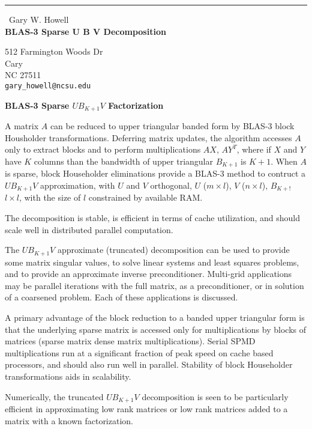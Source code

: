 \documentclass{report}
\begin{document}
\begin{center}
\rule{6in}{1pt} \
{\large Gary W. Howell \\
{\bf BLAS-3 Sparse U B V Decomposition }}

512 Farmington Woods Dr \\ Cary \\ NC 27511
\\
{\tt gary_howell@ncsu.edu}\end{center}

\begin{center}
{\large\bf
BLAS-3 Sparse $U B_{K+1}V$ Factorization} \\[4mm]
\end{center}

\par\vspace*{-1.0mm}\noindent
A matrix $A$ can be reduced to upper triangular banded form
by BLAS-3 block Housholder transformations. Deferring matrix updates, the
algorithm accesses $A$ only to extract blocks and to perform
multiplications $AX$, $AY^T$, where if $X$ and $Y$ have $K$ columns than
the bandwidth of upper triangular $B_{K+1}$ is $K+1$. When $A$ is sparse,
block Householder eliminations provide a BLAS-3 method to contruct a $U
B_{K+1}V$ approximation, with $U$ and $V$ orthogonal, $U$ ($m \times l$),
$V$ ($n \times l$), $B_{K+!}$ $l \times l$, with the size of $l$
constrained by available RAM.

The decomposition is stable, is efficient in terms
of cache utilization, and should scale well in distributed parallel computation.

The $U B_{K+1} V$ approximate (truncated) decomposition can be used to
provide some matrix singular values, to solve linear systems and least
squares problems, and to provide an approximate inverse preconditioner.
Multi-grid applications may be parallel iterations with the full matrix,
as a preconditioner, or in solution of a coarsened problem. Each of these
applications is discussed.

A primary advantage of the block reduction to a banded upper triangular
form is that the underlying sparse matrix is accessed only for
multiplications by blocks of matrices (sparse matrix dense matrix
multiplications). Serial SPMD multiplications run at a significant
fraction of peak speed on cache based processors, and should also run
well in parallel. Stability of block Householder transformations aids in
scalability.

Numerically, the truncated $U B_{K+1} V$ decomposition is seen to be
particularly efficient in approximating low rank matrices or low rank
matrices added to a matrix with a known factorization.
\end{document}
